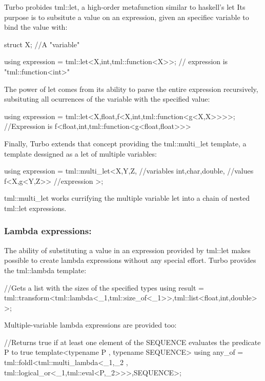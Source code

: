 Turbo probides {\ttfamily tml\+::let}, a high-\/order metafunction similar to haskell's {\ttfamily let} Its purpose is to subsitute a value on an expression, given an specifiec variable to bind the value with\+: \begin{DoxyVerb}struct X{}; //A "variable"

using expression = tml::let<X,int,tml::function<X>>; // expression is "tml::function<int>"
\end{DoxyVerb}


The power of let comes from its ability to parse the entire expression recursively, subsituting all ocurrences of the variable with the specified value\+: \begin{DoxyVerb}using expression = tml::let<X,float,f<X,int,tml::function<g<X,X>>>>; //Expression is f<float,int,tml::function<g<float,float>>>
\end{DoxyVerb}


Finally, Turbo extends that concept providing the {\ttfamily tml\+::multi\+\_\+let} template, a template dessigned as a let of multiple variables\+: \begin{DoxyVerb}using expression = tml::multi_let<X,Y,Z, //variables
                                  int,char,double, //values
                                  f<X,g<Y,Z>> //expression
                                 >;
\end{DoxyVerb}


{\ttfamily tml\+::multi\+\_\+let} works currifying the multiple variable let into a chain of nested {\ttfamily tml\+::let} expressions.

\subsubsection*{Lambda expressions\+:}

The ability of substituting a value in an expression provided by {\ttfamily tml\+::let} makes possible to create lambda expressions without any special effort. Turbo provides the {\ttfamily tml\+::lambda} template\+: \begin{DoxyVerb}//Gets a list with the sizes of the specified types
using result = tml::transform<tml::lambda<_1,tml::size_of<_1>>,tml::list<float,int,double>>;
\end{DoxyVerb}


Multiple-\/variable lambda expressions are provided too\+: \begin{DoxyVerb}//Returns true if at least one element of the SEQUENCE evaluates the predicate P to true
template<typename P , typename SEQUENCE>
using any_of = tml::foldl<tml::multi_lambda<_1,_2 , tml::logical_or<_1,tml::eval<P,_2>>>,SEQUENCE>;
\end{DoxyVerb}


